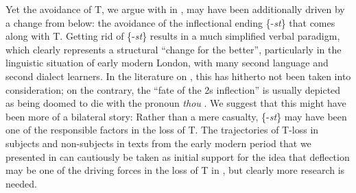 \documentclass[output=paper,hidelinks]{langscibook}
\begin{document}
Yet the avoidance of T, we argue with \citet{Aalberse2015} in , may have been additionally driven by a change from below: the avoidance of the inflectional ending \{-\textit{st}\} that comes along with T. Getting rid of \{-\textit{st}\} results in a much simplified verbal paradigm, which clearly represents a structural \enquote{change for the better}, particularly in the linguistic situation of early modern London, with many second language and second dialect learners. In the literature on , this has hitherto not been taken into consideration; on the contrary, the \enquote{fate of the 2s inflection} is usually depicted as being doomed to die with the pronoun \textit{thou} \citep[e.g.][162]{Lass1999}. We suggest that this might have been more of a bilateral story: Rather than a mere casualty, \{-\textit{st}\} may have been one of the responsible factors in the loss of T. The trajectories of T-loss in subjects and non-subjects in texts from the early modern period that we presented in  can cautiously be taken as initial support for the idea that deflection may be one of the driving forces in the loss of T in , but clearly more research is needed. 


\nocite{CEEC} \nocite{OED}
\printbibliography[heading=subbibliography,notkeyword=this]
\end{document}
